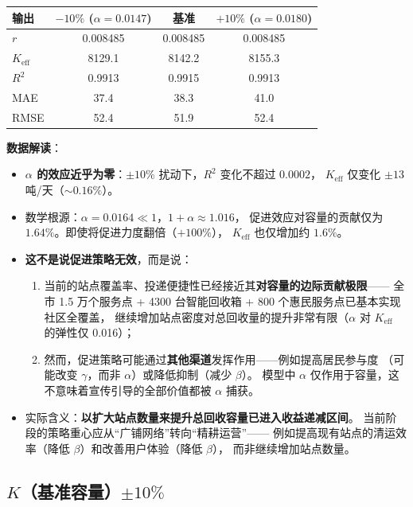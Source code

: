 \documentclass[12pt,a4paper]{article}
\begin{document}
\begin{center}
\begin{tabular}{lccc}
\toprule
输出 & $-10\%$ ($\alpha = 0.0147$) & 基准 & $+10\%$ ($\alpha = 0.0180$) \\
\midrule
$r$      & 0.008485 & 0.008485 & 0.008485 \\
$K_{\text{eff}}$ & 8129.1 & 8142.2 & 8155.3 \\
$R^2$    & 0.9913 & 0.9915 & 0.9913 \\
MAE      & 37.4 & 38.3 & 41.0 \\
RMSE     & 52.4 & 51.9 & 52.4 \\
\bottomrule
\end{tabular}
\end{center}

\textbf{数据解读}：
\begin{itemize}
  \item \textbf{$\alpha$ 的效应近乎为零}：$\pm 10\%$ 扰动下，$R^2$ 变化不超过 $0.0002$，
        $K_{\text{eff}}$ 仅变化 $\pm 13$ 吨/天（$\sim 0.16\%$）。
  \item 数学根源：$\alpha = 0.0164 \ll 1$，$1+\alpha \approx 1.016$，
        促进效应对容量的贡献仅为 $1.64\%$。即使将促进力度翻倍（$+100\%$），
        $K_{\text{eff}}$ 也仅增加约 $1.6\%$。
  \item \textbf{这不是说促进策略无效}，而是说：
        \begin{enumerate}
          \item 当前的站点覆盖率、投递便捷性已经接近其\textbf{对容量的边际贡献极限}——
                全市 1.5 万个服务点 + 4300 台智能回收箱 + 800 个惠民服务点已基本实现社区全覆盖，
                继续增加站点密度对总回收量的提升非常有限（$\alpha$ 对 $K_{\text{eff}}$ 的弹性仅 0.016）；
          \item 然而，促进策略可能通过\textbf{其他渠道}发挥作用——例如提高居民参与度
                （可能改变 $\gamma$，而非 $\alpha$）或降低抑制（减少 $\beta$）。
                模型中 $\alpha$ 仅作用于容量，这不意味着宣传引导的全部价值都被 $\alpha$ 捕获。
        \end{enumerate}
  \item 实际含义：\textbf{以扩大站点数量来提升总回收容量已进入收益递减区间}。
        当前阶段的策略重心应从``广铺网络''转向``精耕运营''——
        例如提高现有站点的清运效率（降低 $\beta$）和改善用户体验（降低 $\beta$），
        而非继续增加站点数量。
\end{itemize}

\subsection{$K$（基准容量）$\pm 10\%$}
\end{document}
